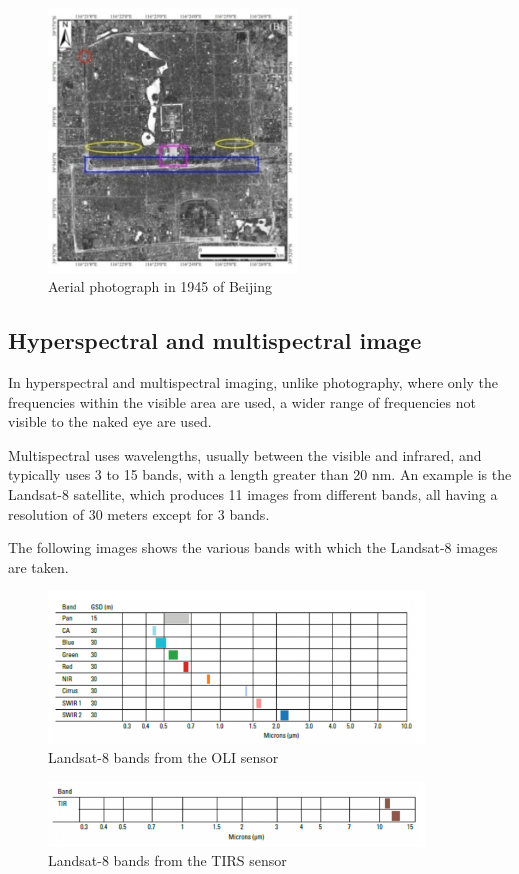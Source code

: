 \begin{figure}[h]
\centering
\includegraphics[height=7cm]{images/foto.png}
\caption{Aerial photograph in 1945 of Beijing \cite{asmr}}
\end{figure}

\subsection{Hyperspectral and multispectral image}
In hyperspectral and multispectral imaging, unlike photography, where only the frequencies within the visible area are used, a wider range of frequencies not visible to the naked eye are used.


Multispectral uses wavelengths, usually between the visible and infrared, and typically uses 3 to 15 bands, with a length greater than 20 nm. An example is the Landsat-8 satellite, which produces 11 images from different bands, all having a resolution of 30 meters except for 3 bands.

The following images shows the various bands with which the Landsat-8 images are taken.

\begin{figure}[H]
\centering
\includegraphics[width=10cm]{images/landsat1.png}
\caption{Landsat-8 bands from the OLI sensor}
\end{figure}

\begin{figure}[H]
\centering
\includegraphics[width=10cm]{images/landsat2.png}
\caption{Landsat-8 bands from the TIRS sensor}
\end{figure}


